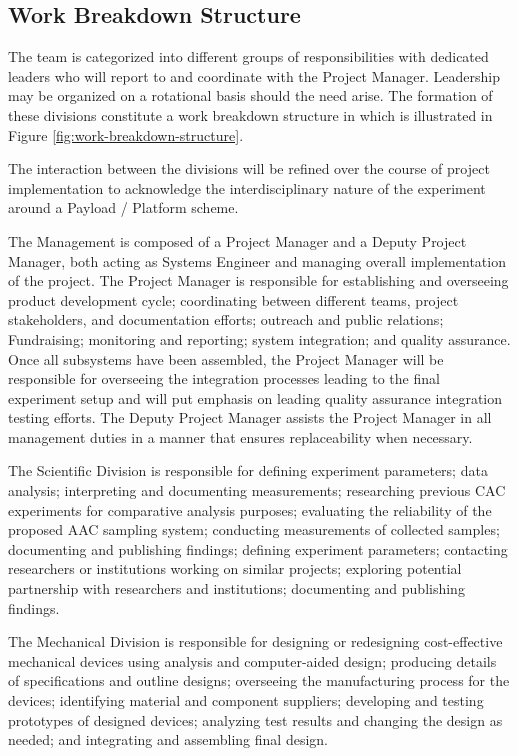 \documentclass[a4paper,12pt,twoside]{article}
\begin{document}
\subsection{Work Breakdown Structure}

The team is categorized into different groups of responsibilities with dedicated leaders who will report to and coordinate with the Project Manager. Leadership may be organized on a rotational basis should the need arise. The formation of these divisions constitute a work breakdown structure in which is illustrated in Figure \ref{fig:work-breakdown-structure}.


The interaction between the divisions will be refined over the course of project implementation to acknowledge the interdisciplinary nature of the experiment around a Payload / Platform scheme.

The Management is composed of a Project Manager and a Deputy Project Manager, both acting as Systems Engineer and managing overall implementation of the project. The Project Manager is responsible for establishing and overseeing product development cycle; coordinating between different teams, project stakeholders, and documentation efforts; outreach and public relations; Fundraising; monitoring and reporting; system integration; and quality assurance. Once all subsystems have been assembled, the Project Manager will be responsible for overseeing the integration processes leading to the final experiment setup and will put emphasis on leading quality assurance integration testing efforts. The Deputy Project Manager assists the Project Manager in all management duties in a manner that ensures replaceability when necessary.

The Scientific Division is responsible for defining experiment parameters; data analysis; interpreting and documenting measurements; researching previous CAC experiments for comparative analysis purposes; evaluating the reliability of the proposed AAC sampling system; conducting measurements of collected samples; documenting and publishing findings; defining experiment parameters; contacting researchers or institutions working on similar projects; exploring potential partnership with researchers and institutions; documenting and publishing findings.

The Mechanical Division is responsible for designing or redesigning cost-effective mechanical devices using analysis and computer-aided design; producing details of specifications and outline designs; overseeing the manufacturing process for the devices; identifying material and component suppliers; developing and testing prototypes of designed devices; analyzing test results and changing the design as needed; and integrating and assembling final design.
\end{document}

